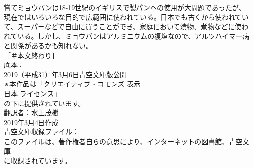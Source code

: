 \documentclass[8pt]{extreport}
\begin{document}
\begin{CJK}{UTF8}{min}
\\	嘗てミョウバンは18-19世紀のイギリスで製パンへの使用が大問題であったが、現在ではいろいろな目的で広範囲に使われている。日本でも古くから使われていて、スーパーなどで自由に買うことができ、家庭において漬物、煮物などに使われている。しかし、ミョウバンはアルミニウムの複塩なので、アルツハイマー病と関係があるかも知れない。
\\	［＃本文終わり］
\\	底本：
\\	2019（平成31）年3月6日青空文庫版公開
\\	※本作品は「クリエイティブ・コモンズ 表示 
\\	日本 ライセンス」
\\	の下に提供されています。
\\	翻訳者：水上茂樹
\\	2019年3月4日作成
\\	青空文庫収録ファイル：
\\	このファイルは、著作権者自らの意思により、インターネットの図書館、青空文庫
\\	に収録されています。
\end{CJK}
\end{document}
